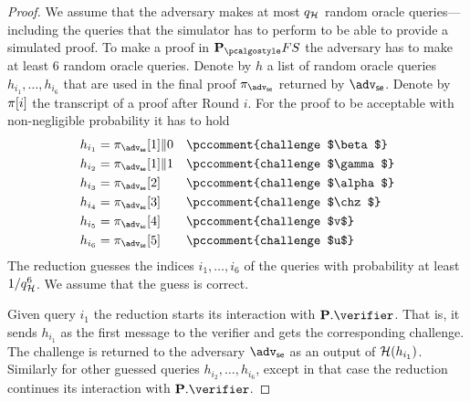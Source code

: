 \documentclass[runningheads,11pt]{llncs}
\theoremstyle{definition}
\begin{document}
\begin{proof}
	We assume that the adversary makes at most $q_{\mathcal{H}}$ random oracle
  queries---including the queries that the simulator has to perform to be able
  to provide a simulated proof.
	To make a proof in $\plonkprotfs$ the adversary has to make at least $6$ random oracle queries. 
	Denote by $h$ a list of random oracle queries $h_{i_1}, \ldots, h_{i_6}$ that are used in the final proof $\zkproof_{\advse}$ returned by $\advse$.
	Denote by $\pi[i]$ the transcript of a proof after Round $i$. 
	For the proof to be acceptable with non-negligible probability it has to hold
	\begin{align*}
		h_{i_1} & = \zkproof_{\advse}[1] \| 0 \quad \pccomment{challenge $\beta$}\\
		h_{i_2} & = \zkproof_{\advse}[1] \| 1 \quad \pccomment{challenge $\gamma$}\\
		h_{i_3} & = \zkproof_{\advse}[2] \qquad \pccomment{challenge $\alpha$}\\
		h_{i_4} & = \zkproof_{\advse}[3] \qquad \pccomment{challenge $\chz$}\\
		h_{i_5} & = \zkproof_{\advse}[4] \qquad \pccomment{challenge $v$}\\
		h_{i_6} & = \zkproof_{\advse}[5] \qquad \pccomment{challenge $u$}
	\end{align*}
	The reduction guesses the indices $i_1, \ldots, i_6$ of the queries with probability at least $1 / q_{\mathcal{H}}^6$. We assume that the guess is correct.
	
	Given query $i_1$ the reduction starts its interaction with $\plonkprot.\verifier$. That is, it sends $h_{i_1}$ as the first message to the verifier and gets the corresponding challenge. The challenge is returned to the adversary $\advse$ as an output of $\mathcal{H}(h_{i_1})$. 
	Similarly for other guessed queries $h_{i_2}, \ldots, h_{i_6}$, except in that case the reduction continues its interaction with  $\plonkprot.\verifier$.
	

\end{proof}
\end{document}
